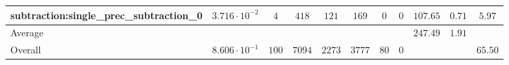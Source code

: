 \begin{tabular}{|l|c|c|c|c|c|c|c|c|c|c|}
subtraction:single\_prec\_subtraction\_0         & $ 3.716 \cdot 10^{-2} $ & $ 4      $ & $ 418  $ & $ 121  $ & $ 169   $ & $ 0  $ & $ 0 $ & $ 107.65      $ & $ 0.71    $ & $ 5.97    $ \\
\hline
Average                                          & $                     $ & $        $ & $      $ & $      $ & $       $ & $    $ & $   $ & $ 247.49      $ & $ 1.91    $ & $         $ \\
\hline
Overall                                          & $ 8.606 \cdot 10^{-1} $ & $ 100    $ & $ 7094 $ & $ 2273 $ & $ 3777  $ & $ 80 $ & $ 0 $ & $             $ & $         $ & $ 65.50   $ \\
\hline
\end{tabular}
